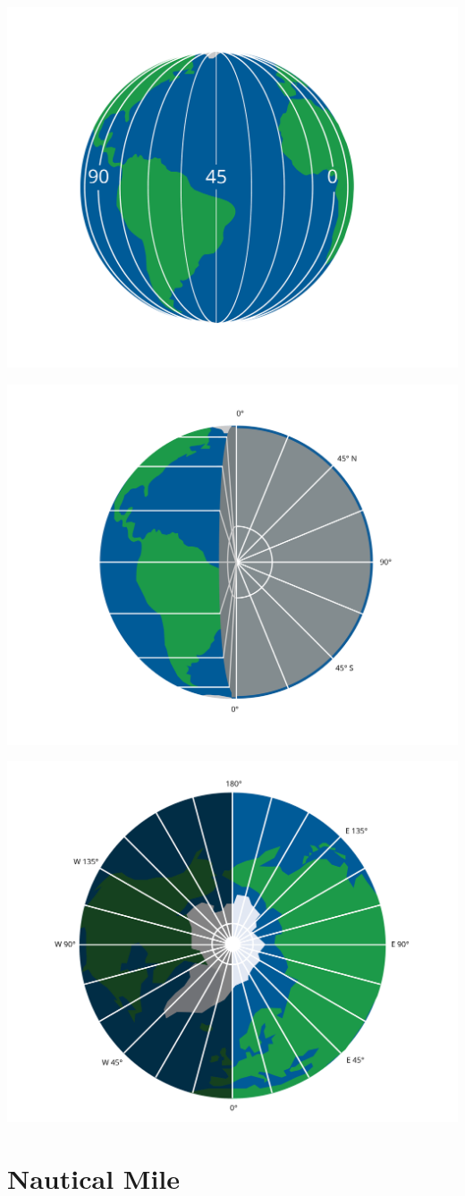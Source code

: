 \includegraphics[width=.75\textwidth]{long.png}

\includegraphics[width=.75\textwidth]{latExplanation.png}

\includegraphics[width=.75\textwidth]{longExplanation.png}


\section{Nautical Mile}

